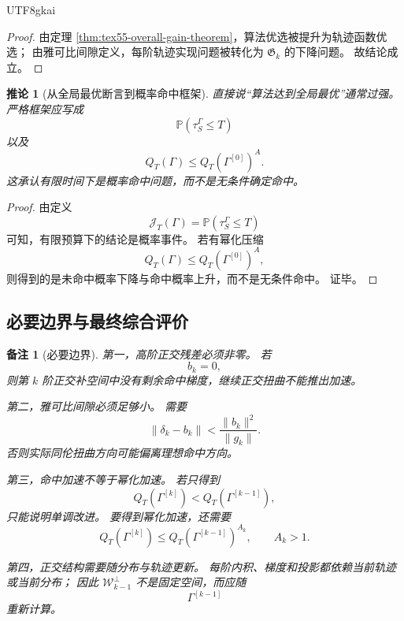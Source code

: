 \documentclass[12pt]{article}
\newtheorem{corollary}{推论}[section]
\newtheorem{remark}{备注}[section]
\begin{document}
\begin{CJK*}{UTF8}{gkai}
\begin{proof}
由定理 \ref{thm:tex55-overall-gain-theorem}，算法优选被提升为轨迹函数优选；
由雅可比间隙定义，每阶轨迹实现问题被转化为 \(\mathfrak G_k\) 的下降问题。
故结论成立。
\end{proof}

\begin{corollary}[从全局最优断言到概率命中框架]
\label{cor:tex55-gain-global-claim-to-hit}
直接说“算法达到全局最优”通常过强。
严格框架应写成
\[
  \mathbb P(\tau_S^\Gamma\le T)
\]
以及
\[
  Q_T(\Gamma)
  \le
  Q_T(\Gamma^{[0]})^A.
\]
这承认有限时间下是概率命中问题，而不是无条件确定命中。
\end{corollary}

\begin{proof}
由定义
\[
  \mathcal J_T(\Gamma)=\mathbb P(\tau_S^\Gamma\le T)
\]
可知，有限预算下的结论是概率事件。
若有幂化压缩
\[
  Q_T(\Gamma)\le Q_T(\Gamma^{[0]})^A,
\]
则得到的是未命中概率下降与命中概率上升，而不是无条件命中。
证毕。
\end{proof}

\subsection{必要边界与最终综合评价}
\label{subsec:tex55-gain-boundaries-final}

\begin{remark}[必要边界]
第一，高阶正交残差必须非零。
若
\[
  b_k=0,
\]
则第 \(k\) 阶正交补空间中没有剩余命中梯度，继续正交扭曲不能推出加速。

第二，雅可比间隙必须足够小。
需要
\[
  \lVert\delta_k-b_k\rVert
  <
  \frac{\lVert b_k\rVert^2}{\lVert g_k\rVert}.
\]
否则实际同伦扭曲方向可能偏离理想命中方向。

第三，命中加速不等于幂化加速。
若只得到
\[
  Q_T(\Gamma^{[k]})<Q_T(\Gamma^{[k-1]}),
\]
只能说明单调改进。
要得到幂化加速，还需要
\[
  Q_T(\Gamma^{[k]})
  \le
  Q_T(\Gamma^{[k-1]})^{A_k},
  \qquad
  A_k>1.
\]

第四，正交结构需要随分布与轨迹更新。
每阶内积、梯度和投影都依赖当前轨迹或当前分布；
因此 \(\mathcal W_{k-1}^\perp\) 不是固定空间，而应随
\[
  \Gamma^{[k-1]}
\]
重新计算。
\end{remark}


\end{CJK*}
\end{document}

